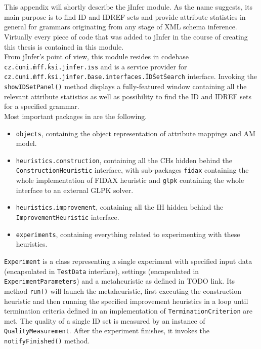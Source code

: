 \chapter{}
\label{appendix-iss}


This appendix will shortly describe the  jInfer module. As the name suggests, its main purpose is to find ID and IDREF sets and provide attribute statistics in general for grammars originating from any stage of XML schema inference. Virtually every piece of code that was added to jInfer in the course of creating this thesis is contained in this module.\\

From jInfer's point of view, this module resides in codebase \texttt{cz.\.cuni.\.mff.\.ksi.\.jinfer.\.iss} and is a service provider for \texttt{cz.\.cuni.\.mff.\.ksi.\.jinfer.\.base.\.inter\.faces.\.ID\.Set\.Search} interface. Invoking the \texttt{showIDSetPanel()} method displays a fully-featured window containing all the relevant attribute statistics as well as possibility to find the ID and IDREF sets for a specified grammar.\\

Most important packages in  are the following.

\begin{itemize}
	\item \texttt{objects}, containing the object representation of attribute mappings and AM model.
	\item \texttt{heuristics.construction}, containing all the CHs hidden behind the \texttt{Con\-struc\-tion\-Heu\-ris\-tic} interface, with sub-packages \texttt{fidax} containing the whole implementation of FIDAX heuristic %
	and \texttt{glpk} containing the whole interface to an external GLPK solver. %
	\item \texttt{heuristics.improvement}, containing all the IH hidden behind the \texttt{Im\-prove\-ment\-Heu\-ris\-tic} interface.
	\item \texttt{experiments}, containing everything related to experimenting with these heuristics.
\end{itemize}

\texttt{Experiment} is a class representing a single experiment with specified input data (encapsulated in \texttt{Test\-Data} interface), settings (encapsulated in \texttt{Ex\-pe\-ri\-ment\-Pa\-ra\-me\-ters}) and a metaheuristic as defined in TODO link. Its method \texttt{run()} will launch the metaheuristic, first executing the construction heuristic and then running the specified improvement heuristics in a loop until termination criteria defined in an implementation of \texttt{Ter\-mi\-na\-tion\-Cri\-ter\-ion} are met. The quality of a single ID set is measured by an instance of \texttt{Quality\-Measurement}. After the experiment finishes, it invokes the \texttt{notify\-Finished()} method.\\

